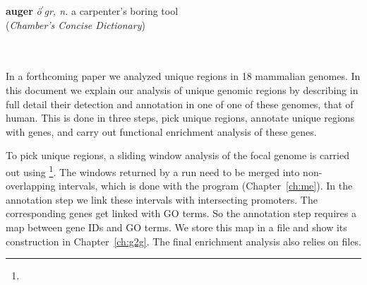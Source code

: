 \hspace{6.5cm}\begin{minipage}{10cm}\textbf{auger} \emph{\"o$^\prime$g\schwa r, n.} a carpenter's
boring tool\\(\emph{Chamber's Concise Dictionary})
\end{minipage}\\\\
In a forthcoming paper we analyzed unique regions in 18 mammalian
genomes. In this document we explain our analysis of unique genomic
regions by describing in full detail their detection and annotation in
one of one of these genomes, that of human. This is done in three
steps, pick unique regions, annotate unique regions with genes, and
carry out functional enrichment analysis of these genes.

To pick unique regions, a sliding window analysis of the focal genome
is carried out
using \footnote{}. The
windows returned by a  run need to be merged into
non-overlapping intervals, which is done with the program 
(Chapter~\ref{ch:me}). In the annotation step we link these intervals
with intersecting promoters. The corresponding genes get linked with
GO terms. So the annotation step requires a map between gene IDs and
GO terms. We store this map in a  file and show its
construction in Chapter~\ref{ch:g2g}. The final enrichment analysis
also relies on  files.
